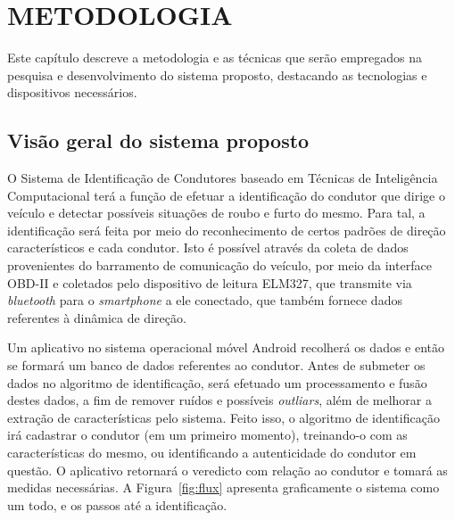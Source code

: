 \chapter{METODOLOGIA}
\label{cap:metodologia}

Este capítulo descreve a metodologia e as técnicas que serão empregados na pesquisa e desenvolvimento do sistema proposto, destacando as tecnologias e dispositivos necessários.

\section{Visão geral do sistema proposto}

O Sistema de Identificação de Condutores baseado em Técnicas de Inteligência Computacional terá a função de efetuar a identificação do condutor que dirige o veículo e detectar possíveis situações de roubo e furto do mesmo. Para tal, a identificação será feita por meio do reconhecimento de certos padrões de direção característicos e cada condutor. Isto é possível através da coleta de dados provenientes do barramento de comunicação do veículo, por meio da interface OBD-II e coletados pelo dispositivo de leitura ELM327, que transmite via \textit{bluetooth} para o \textit{smartphone} a ele conectado, que também fornece dados referentes à dinâmica de direção.

Um aplicativo no sistema operacional móvel Android recolherá os dados e então se formará um banco de dados referentes ao condutor. Antes de submeter os dados no algoritmo de identificação, será efetuado um processamento e fusão destes dados, a fim de remover ruídos e possíveis \textit{outliars}, além de melhorar a extração de características pelo sistema. Feito isso, o algoritmo de identificação irá cadastrar o condutor (em um primeiro momento), treinando-o com as características do mesmo, ou identificando a autenticidade do condutor em questão. O aplicativo retornará o veredicto com relação ao condutor e tomará as medidas necessárias. A Figura~\ref{fig:flux} apresenta graficamente o sistema como um todo, e os passos até a identificação.

